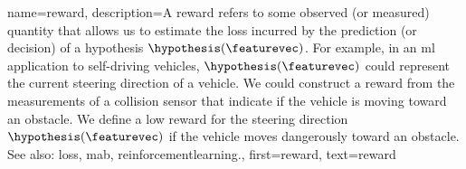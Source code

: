 {name={reward}, 
	description={A reward refers to some observed 
		(or measured) quantity that allows us to estimate the \gls{loss} incurred by the \gls{prediction} 
		(or decision) of a \gls{hypothesis} $\hypothesis(\featurevec)$. For example, in an 
		\gls{ml} application to self-driving vehicles, $\hypothesis(\featurevec)$ could represent 
		the current steering direction of a vehicle. We could construct a reward from the 
		measurements of a collision sensor that indicate if the vehicle is moving toward 
		an obstacle. We define a low reward for the steering direction 
		$\hypothesis(\featurevec)$ if the vehicle moves dangerously toward an obstacle.
			\\
		See also: \gls{loss}, \gls{mab}, \gls{reinforcementlearning}.},
	first={reward}, 
	text={reward}
} 

